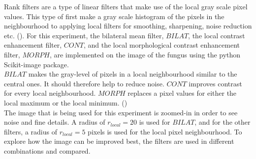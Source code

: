 
Rank filters are a type of linear filters that make use of the local gray scale pixel values. This type of first make a gray scale histogram of the pixels in the neighbourhood to applying local filters for smoothing, sharpening, noise reduction etc. (\cite{rank}).  
For this experiment, the bilateral mean filter, $BILAT$, the local contrast enhancement filter, $CONT$, and the local morphological contrast enhancement filter, $MORPH$, are implemented on the image of the fungus using the python Scikit-image package.\\
$BILAT$ makes the gray-level of pixels in a local neighbourhood similar to the central ones. It should therefore help to reduce noise. $CONT$ improves contrast for every local neighbourhood. $MORPH$ replaces a pixel values for either the local maximum or the local minimum. (\cite{rank}) \\
The image that is being used for this experiment is zoomed-in in order to see noise and fine details. A radius of $r_{local} = 20$ is used for $BILAT$, and for the other filters, a radius of $r_{local} = 5$ pixels is used for the local pixel neighbourhood. To explore how the image can be improved best, the filters are used in different combinations and compared.
\clearpage

